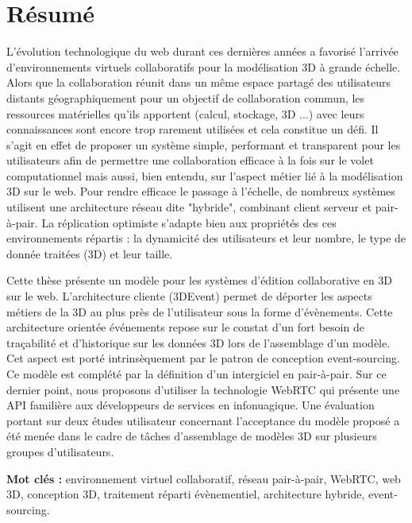 \clearpage
\singlespacing
{\small
{\centering \section*{Résumé}}
\adjustmtc
{}

L’évolution technologique du web durant ces dernières années a favorisé l’arrivée 
d’environnements virtuels collaboratifs pour la modélisation 3D à grande échelle. 
Alors que la collaboration réunit dans un même espace partagé des utilisateurs 
distants géographiquement pour un objectif de collaboration commun, les 
ressources 
matérielles qu'ils apportent (calcul, stockage, 3D ...) avec leurs connaissances 
sont encore trop rarement utilisées et cela constitue un défi. Il s'agit en effet 
de proposer un système simple, performant et transparent pour les utilisateurs 
afin de permettre une collaboration efficace à la fois sur le volet computationnel 
mais aussi, bien entendu, sur l'aspect métier lié à la modélisation 3D sur le web.
Pour rendre efficace le passage à l’échelle, de nombreux systèmes utilisent une 
architecture réseau dite "hybride", combinant client serveur et pair-à-pair. La 
réplication optimiste s'adapte bien aux propriétés des ces environnements répartis 
: la dynamicité des utilisateurs et leur nombre, le type de donnée traitées (3D) 
et leur taille. 

Cette thèse présente un modèle pour les systèmes d’édition collaborative en 3D 
sur le web. L'architecture cliente (3DEvent) permet de déporter les 
aspects métiers de la 3D au plus près de l’utilisateur sous la forme d’évènements. 
Cette architecture orientée événements repose sur le constat 
d’un fort besoin de traçabilité et d’historique sur les données 3D lors de 
l’assemblage d’un modèle. Cet aspect est porté intrinsèquement par le patron de 
conception event-sourcing. Ce modèle est complété par la définition d’un 
intergiciel en pair-à-pair. Sur ce dernier point, nous proposons d'utiliser la 
technologie WebRTC qui présente une API familière aux développeurs de services 
en infonuagique. Une évaluation portant sur deux études utilisateur concernant 
l’acceptance du modèle proposé a été menée dans le cadre de tâches 
d’assemblage de 
modèles 3D sur plusieurs groupes d’utilisateurs.

\textbf{Mot clés : }environnement virtuel collaboratif, réseau pair-à-pair, WebRTC, 
web 3D, conception 3D, traitement réparti évènementiel, architecture hybride, 
event-sourcing.

}
